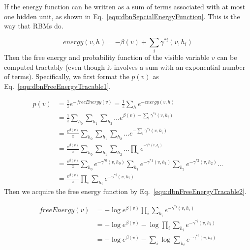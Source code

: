 \documentclass[runningheads,openany]{xhlPaper}
\begin{document}
If the energy function can be written as a sum of terms associated with at most one hidden unit, as shown in Eq.~\ref{equ:dbnSepcialEnergyFunction}. This is the way that RBMs do. 

\begin{equation}
\label{equ:dbnSepcialEnergyFunction}
energy\left( {v,h} \right) =  - \beta \left( v \right) + \sum\limits_i {\gamma ^{*i}\left( {v,{h_i}} \right)}
\end{equation}
Then the free energy and probability function of the visible variable $v$ can be computed tractably (even though it involves a sum with an exponential number of terms). Specifically, we first format the $p\left(v\right)$ as Eq.~\ref{equ:dbnFreeEnergyTracable1}.

\begin{equation}
\label{equ:dbnFreeEnergyTracable1}
\begin{aligned}
p\left( v \right) &= \frac{1}{z}{e^{ - freeEnergy\left( v \right)}} = \frac{1}{z}\sum\limits_h {{e^{ - energy\left( {v,h} \right)}}} \\
 &= \frac{1}{z}\sum\limits_{{h_0}} {\sum\limits_{{h_1}} {\sum\limits_{{h_2}} {...{e^{\beta \left( v \right) - \sum\limits_i {{\gamma ^{*i}}\left( {v,{h_i}} \right)} }}} } } \\
 &= \frac{{{e^{\beta \left( v \right)}}}}{z}\sum\limits_{{h_0}} {\sum\limits_{{h_1}} {\sum\limits_{{h_2}} {...{e^{ - \sum\limits_i {{\gamma ^{*i}}\left( {v,{h_i}} \right)} }}} } } \\
 &= \frac{{{e^{\beta \left( v \right)}}}}{z}\sum\limits_{{h_0}} {\sum\limits_{{h_1}} {\sum\limits_{{h_2}} {...\prod\limits_i {{e^{^{ - {\gamma ^{*i}}\left( {v,{h_i}} \right)}}}} } } } \\
 &= \frac{{{e^{\beta \left( v \right)}}}}{z}\sum\limits_{{h_0}} {{e^{ - {\gamma ^{*0}}\left( {v,{h_0}} \right)}}} \sum\limits_{{h_1}} {{e^{ - {\gamma ^{*1}}\left( {v,{h_1}} \right)}}} \sum\limits_{{h_2}} {{e^{ - {\gamma ^{*2}}\left( {v,{h_2}} \right)}}} ...\\
 &= \frac{{{e^{\beta \left( v \right)}}}}{z}\prod\limits_i {\sum\limits_{{h_i}} {{e^{ - {\gamma ^{*i}}\left( {v,{h_i}} \right)}}} } 
\end{aligned}
\end{equation}
Then we acquire the free energy function by Eq.~\ref{equ:dbnFreeEnergyTracable2}.

\begin{equation}
\label{equ:dbnFreeEnergyTracable2}
\begin{aligned}
freeEnergy\left( v \right) &=  - \log {e^{\beta \left( v \right)}}\prod\limits_i {\sum\limits_{{h_i}} {{e^{ - {\gamma ^{*i}}\left( {v,{h_i}} \right)}}} } \\
 &=  - \log {e^{\beta \left( v \right)}} - \log \prod\limits_i {\sum\limits_{{h_i}} {{e^{ - {\gamma ^{*i}}\left( {v,{h_i}} \right)}}} } \\
 &=  - \log {e^{\beta \left( v \right)}} - \sum\limits_i {\log } \sum\limits_{{h_i}} {{e^{ - {\gamma ^{*i}}\left( {v,{h_i}} \right)}}} 
\end{aligned}
\end{equation}
\end{document}
